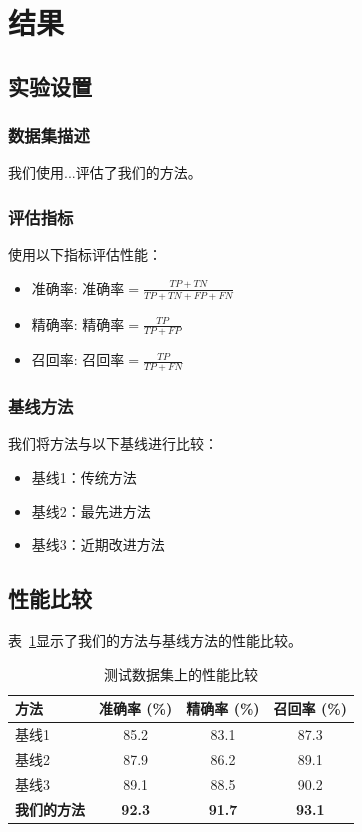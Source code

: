 \section{结果}
\label{sec:results}


\subsection{实验设置}

\subsubsection{数据集描述}
我们使用...评估了我们的方法。

\subsubsection{评估指标}
使用以下指标评估性能：
\begin{itemize}
    \item 准确率: $\text{准确率} = \frac{TP + TN}{TP + TN + FP + FN}$
    \item 精确率: $\text{精确率} = \frac{TP}{TP + FP}$
    \item 召回率: $\text{召回率} = \frac{TP}{TP + FN}$
\end{itemize}

\subsubsection{基线方法}
我们将方法与以下基线进行比较：
\begin{itemize}
    \item 基线1：传统方法 \cite{ref1}
    \item 基线2：最先进方法 \cite{ref2}
    \item 基线3：近期改进方法 \cite{ref3}
\end{itemize}

\subsection{性能比较}

表~\ref{tab:results}显示了我们的方法与基线方法的性能比较。

\begin{table}[ht]
\centering
\caption{测试数据集上的性能比较}
\label{tab:results}
\begin{tabular}{lccc}
\hline
方法 & 准确率 (\%) & 精确率 (\%) & 召回率 (\%) \\
\hline
基线1 & 85.2 & 83.1 & 87.3 \\
基线2 & 87.9 & 86.2 & 89.1 \\
基线3 & 89.1 & 88.5 & 90.2 \\
\textbf{我们的方法} & \textbf{92.3} & \textbf{91.7} & \textbf{93.1} \\
\hline
\end{tabular}
\end{table}

